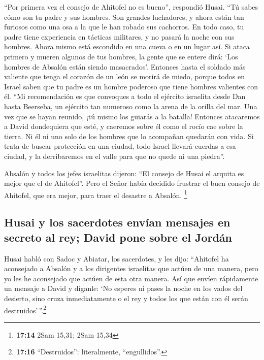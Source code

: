  ``Por primera vez el consejo de Ahitofel no es bueno'',
respondió Husai.  ``Tú sabes cómo son tu padre y sus
hombres. Son grandes luchadores, y ahora están tan furiosos como una osa
a la que le han robado sus cachorros. En todo caso, tu padre tiene
experiencia en tácticas militares, y no pasará la noche con sus hombres.
 Ahora mismo está escondido en una cueva o en un lugar
así. Si ataca primero y mueren algunos de tus hombres, la gente que se
entere dirá: `Los hombres de Absalón están siendo masacrados'.
 Entonces hasta el soldado más valiente que tenga el
corazón de un león se morirá de miedo, porque todos en Israel saben que
tu padre es un hombre poderoso que tiene hombres valientes con él.
 ``Mi recomendación es que convoques a todo el ejército
israelita desde Dan hasta Beerseba, un ejército tan numeroso como la
arena de la orilla del mar. Una vez que se hayan reunido, ¡tú mismo los
guiarás a la batalla!  Entonces atacaremos a David
dondequiera que esté, y caeremos sobre él como el rocío cae sobre la
tierra. Ni él ni uno solo de los hombres que lo acompañan quedarán con
vida.  Si trata de buscar protección en una ciudad, todo
Israel llevará cuerdas a esa ciudad, y la derribaremos en el valle para
que no quede ni una piedra''.

 Absalón y todos los jefes israelitas dijeron: ``El
consejo de Husai el arquita es mejor que el de Ahitofel''. Pero el Señor
había decidido frustrar el buen consejo de Ahitofel, que era mejor, para
traer el desastre a Absalón. \footnote{\textbf{17:14} 2Sam 15,31; 2Sam
  15,34}

\hypertarget{husai-y-los-sacerdotes-envuxedan-mensajes-en-secreto-al-rey-david-pone-sobre-el-jorduxe1n}{%
\subsection{Husai y los sacerdotes envían mensajes en secreto al rey;
David pone sobre el
Jordán}\label{husai-y-los-sacerdotes-envuxedan-mensajes-en-secreto-al-rey-david-pone-sobre-el-jorduxe1n}}

 Husai habló con Sadoc y Abiatar, los sacerdotes, y les
dijo: ``Ahitofel ha aconsejado a Absalón y a los dirigentes israelitas
que actúen de una manera, pero yo les he aconsejado que actúen de esta
otra manera.  Así que envíen rápidamente un mensaje a
David y díganle: `No esperes ni pases la noche en los vados del
desierto, sino cruza inmediatamente o el rey y todos los que están con
él serán destruidos'\,''.\footnote{\textbf{17:16} ``Destruidos'':
  literalmente, ``engullidos''.}

